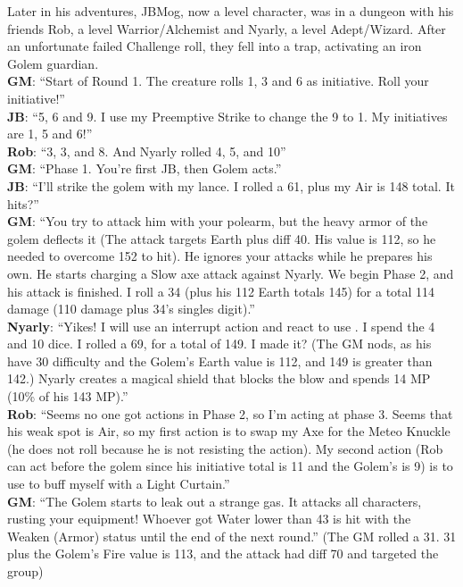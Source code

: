 \begin{multimog}
Later in his adventures, JBMog, now a  level character, was in a dungeon with his friends Rob, a  level Warrior/Alchemist and Nyarly, a  level Adept/Wizard. After an unfortunate failed Challenge roll, they fell into a trap, activating an iron Golem guardian. \\
\textbf{GM}: \enquote{Start of Round 1. The creature rolls 1, 3 and 6 as initiative. Roll your initiative!} \\
\textbf{JB}: \enquote{5, 6 and 9. I use my Preemptive Strike to change the 9 to 1. My initiatives are 1, 5 and 6!} \\
\textbf{Rob}: \enquote{3, 3, and 8. And Nyarly rolled 4, 5, and 10} \\
\textbf{GM}: \enquote{Phase 1. You're first JB, then Golem acts.} \\
\textbf{JB}: \enquote{I'll strike the golem with my lance. I rolled a 61, plus my Air is 148 total. It hits?} \\
\textbf{GM}: \enquote{You try to attack him with your polearm, but the heavy armor of the golem deflects it (The attack targets Earth plus diff 40. His value is 112, so he needed to overcome 152 to hit). He ignores your attacks while he prepares his own. He starts charging a Slow axe attack against Nyarly. We begin Phase 2, and his attack is finished. I roll a 34 (plus his 112 Earth totals 145) for a total 114 damage (110 damage plus 34's singles digit).} \\
\textbf{Nyarly}: \enquote{Yikes! I will use an interrupt action and react to use . I spend the 4 and 10 dice. I rolled a 69, for a total of 149. I made it? (The GM nods, as his  have 30 difficulty and the Golem's Earth value is 112, and 149 is greater than 142.) Nyarly creates a magical shield that blocks the blow and spends 14 MP (10\% of his 143 MP).} \\
\textbf{Rob}: \enquote{Seems no one got actions in Phase 2, so I'm acting at phase 3. Seems that his weak spot is Air, so my first action is  to swap my Axe for the Meteo Knuckle (he does not roll because he is not resisting the action). My second action (Rob can act before the golem since his initiative total is 11 and the Golem's is 9) is to use  to buff  myself with a Light Curtain.} \\
\textbf{GM}: \enquote{The Golem starts to leak out a strange gas. It attacks all characters, rusting your equipment! Whoever got Water lower than 43 is hit with the Weaken (Armor) status until the end of the next round.} (The GM rolled a 31. 31 plus the Golem's Fire value is 113, and the attack had diff 70 and targeted the group) \\

\end{multimog}
